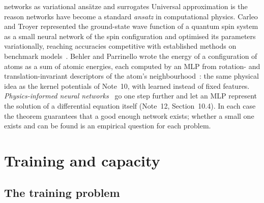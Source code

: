 \documentclass[11pt]{article}
\begin{document}
\begin{physics}{networks as variational ansätze and surrogates}
Universal approximation is the reason networks have become a standard \emph{ansatz} in computational physics.
Carleo and Troyer represented the ground-state wave function of a quantum spin system as a small neural network of the
spin configuration and optimised its parameters variationally, reaching accuracies competitive with established
methods on benchmark models~\cite{carleo2017}. Behler and Parrinello wrote the energy of a configuration of atoms as a
sum of atomic energies, each computed by an MLP from rotation- and translation-invariant descriptors of the atom's
neighbourhood~\cite{behler2007}: the same physical idea as the kernel potentials of Note~10, with learned instead of
fixed features. \emph{Physics-informed neural networks}~\cite{raissi2019} go one step further and let an MLP represent
the solution of a differential equation itself (Note~12, Section~10.4). In each case the theorem guarantees that a good
enough network exists; whether a small one exists and can be found is an empirical question for each problem.
\end{physics}

\section{Training and capacity}\label{sec:capacity}

\subsection{The training problem}\label{sec:objective}
\end{document}
